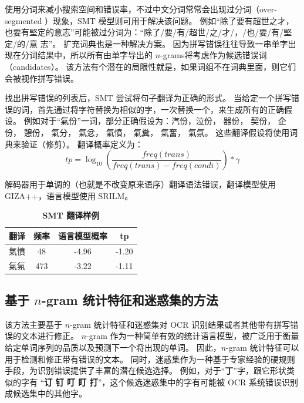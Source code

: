 使用分词来减小搜索空间和错误率，不过中文分词常常会出现过分词（over-segmented ）现象，SMT 模型则可用于解决该问题。
例如“除了要有超世之才，也要有堅定的意志”可能被过分词为：“除了/要/有/超世/之/才/，/也/要/有/堅定/的/意
志”。
扩充词典也是一种解决方案。
因为拼写错误往往导致一串单字出现在分词结果中，所以所有由单字导出的 $n$-grams将考虑作为候选错误词（candidates）。
该方法有个潜在的局限性就是，如果词组不在词典里面，则它们会被视作拼写错误。

找出拼写错误的列表后，SMT 尝试将句子翻译为正确的形式。
当给定一个拼写错误的词，首先通过将字符替换为相似的字，一次替换一个，来生成所有的正确假设。
例如对于“氣份”一词，部分正确假设为：汽份，泣份，
器份， 契份，
企份， 憩份，
氣分， 氣忿，
氣憤， 氣糞，
氣奮， 氣氛。
这些翻译假设将使用词典来验证（修剪）。
翻译概率定义为：
\begin{equation}
tp = \log_{10} \left(\frac{freq(trans)}{freq(trans) - freq(condi)}\right)*\gamma
\end{equation}

解码器用于单调的（也就是不改变原来语序）翻译语法错误，翻译模型使用GIZA++，语言模型使用 SRILM。

\begin{table}[!hpt]
	\caption[]{\textbf{SMT 翻译样例}}
	\label{tab:smt_tanslation}
	\centering
	\begin{tabular}{c c c c}
		\hline
		\textbf{翻译} & \textbf{频率} & \textbf{语言模型概率} & \textbf{tp} \\ [0.5ex] 
		\hline
		氣憤 & 48 & -4.96 & -1.20 \\
		氣氛 & 473 & -3.22 & -1.11 \\[1ex] 
		\hline
	\end{tabular}
\end{table}

\subsection{基于 $n$-gram 统计特征和迷惑集的方法}
\label{n_gram}
该方法主要基于 $n$-gram 统计特征和迷惑集对 OCR 识别结果或者其他带有拼写错误的文本进行修正。
$n$-gram 作为一种简单有效的统计语言模型，被广泛用于衡量给定单词序列的品质以及预测下一个将出现的单词。
因此，$n$-gram 统计特征可以用于检测和修正带有错误的文本。
同时，迷惑集作为一种基于专家经验的硬规则手段，为识别错误提供了丰富的潜在候选选择。
例如，对于“\textbf{丁}”字，跟它形状类似的字有 “\textbf{订 钉 叮 盯 打}”，这个候选迷惑集中的字有可能被 OCR 系统错误识别成候选集中的其他字。

